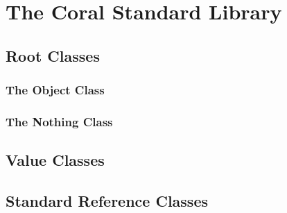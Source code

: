 
\chapter{The Coral Standard Library}

\section{Root Classes}

\subsection{The Object Class}

\subsection{The Nothing Class}

\section{Value Classes}

\section{Standard Reference Classes}


